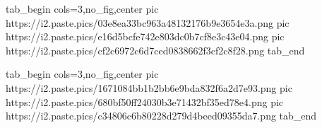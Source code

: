  
 
 
 
 
\zzSecCmtScr

\ifcmt
  tab_begin cols=3,no_fig,center
     pic https://i2.paste.pics/03e8ea33bc963a48132176b9e3654e3a.png
		 pic https://i2.paste.pics/e16d5bcfe742e803dc0b7cf8e3c43e04.png
		 pic https://i2.paste.pics/cf2c6972c6d7ced0838662f3cf2c8f28.png
  tab_end
\fi

\ifcmt
  tab_begin cols=3,no_fig,center
		 pic https://i2.paste.pics/1671084bb1b2bb6e9bda832f6a2d7e93.png
		 pic https://i2.paste.pics/680bf50ff24030b3e71432bf35ed78e4.png
		 pic https://i2.paste.pics/c34806c6b80228d279d4beed09355da7.png
  tab_end
\fi
